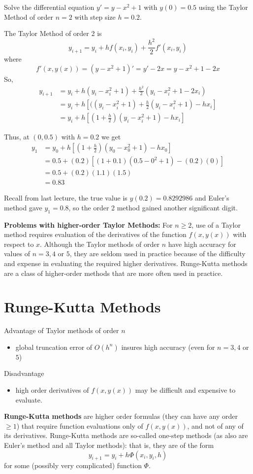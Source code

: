 \documentclass [titlepage,12pt,letter] {article}
\begin{document}
Solve the differential equation $y'=y-x^2+1$ with $y(0)=0.5$ using the Taylor Method of order $n=2$ with step size $h=0.2$.

\vspace{\baselineskip}

The Taylor Method of order 2 is
\[
y_{i+1}=y_i + hf(x_i,y_i) + \frac{h^2}{2}f'(x_i,y_i)
\]
where
\[
f'(x,y(x)) = (y-x^2+1)' = y' - 2x = y-x^2+1-2x
\]
So,
\begin{align*}
y_{i+1} &= y_i + h(y_i - x_i^2 +1) + \frac{h^2}{2}(y_i - x_i^2 +1 - 2x_i) \\
&= y_i + h \left [((y_i - x_i^2 +1) + \frac{h}{2}(y_i - x_i^2 +1) - hx_i \right ] \\
&= y_i + h \left [(1+\frac{h}{2})(y_i - x_i^2 +1)  - hx_i \right ]
\end{align*}

Thus, at $(0,0.5)$ with $h=0.2$ we get
\begin{align*}
y_1 &= y_0 +  h \left [(1+\frac{h}{2})(y_0 - x_0^2 +1)  - hx_0 \right ] \\
&= 0.5 +(0.2)\left [(1 + 0.1)(0.5 - 0^2 +1) - (0.2)(0) \right ] \\
&= 0.5 + (0.2)(1.1)(1.5) \\
&= 0.83
\end{align*}

Recall from last lecture, the true value is $y(0.2)=0.8292986$ and Euler's method gave $y_1=0.8$, so the order 2 method gained another significant digit.

{\bf Problems with higher-order Taylor Methods:}
For $n \geq 2$, use of a Taylor method requires evaluation of the derivatives of the function $f(x,y(x))$ with respect to $x$. Although the Taylor methods of order $n$ have high accuracy for values of $n = 3, 4 \text{ or } 5$, they are seldom used in practice because of the difficulty and expense in evaluating the required higher derivatives. Runge-Kutta methods are a class of higher-order methods that are more often used in practice.

\section{Runge-Kutta Methods}

Advantage of Taylor methods of order $n$
\begin{itemize}
\item{global truncation error of $O(h^n)$ insures high accuracy (even for $n = 3, 4$ or $5$)}
\end{itemize}
Disadvantage
\begin{itemize}
\item{high order derivatives of $f(x,y(x))$ may be difficult and expensive to evaluate.}
\end{itemize}
\vspace{\baselineskip}
{\bf Runge-Kutta methods} are higher order formulas (they can have any order $\geq 1$) that require function evaluations only of  $f(x,y(x))$, and not of any of its derivatives. Runge-Kutta methods are so-called one-step methods (as also are Euler’s method and all Taylor methods): that is, they are of the form
\[
y_{i+1}=y_i+h\Phi(x_i,y_i,h)
\]
for some (possibly very complicated) function $\Phi$.  
\end{document}
